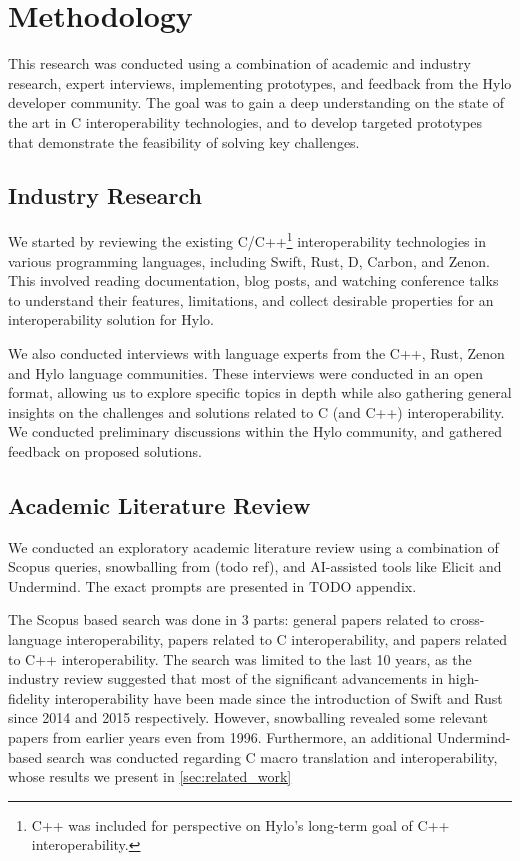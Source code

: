 \section{Methodology}
This research was conducted using a combination of academic and industry research, expert interviews, implementing prototypes, and feedback from the Hylo developer community. The goal was to gain a deep understanding on the state of the art in C interoperability technologies, and to develop targeted prototypes that demonstrate the feasibility of solving key challenges. 

\subsection{Industry Research}
We started by reviewing the existing C/C++\footnote{C++ was included for perspective on Hylo's long-term goal of C++ interoperability.} interoperability technologies in various programming languages, including Swift, Rust, D, Carbon, and Zenon. This involved reading documentation, blog posts, and watching conference talks to understand their features, limitations, and collect desirable properties for an interoperability solution for Hylo.

We also conducted interviews with language experts from the C++, Rust, Zenon and Hylo language communities. These interviews were conducted in an open format, allowing us to explore specific topics in depth while also gathering general insights on the challenges and solutions related to C (and C++) interoperability. We conducted preliminary discussions within the Hylo community, and gathered feedback on proposed solutions.

\subsection{Academic Literature Review}
We conducted an exploratory academic literature review using a combination of Scopus queries, snowballing from (todo ref), and AI-assisted tools like Elicit and Undermind. The exact prompts are presented in TODO appendix.

The Scopus based search was done in 3 parts: general papers related to cross-language interoperability, papers related to C interoperability, and papers related to C++ interoperability. The search was limited to the last 10 years, as the industry review suggested that most of the significant advancements in high-fidelity interoperability have been made since the introduction of Swift and Rust since 2014 and 2015 respectively. However, snowballing revealed some relevant papers from earlier years even from 1996. Furthermore, an additional Undermind-based search was conducted regarding C macro translation and interoperability, whose results we present in \autoref{sec:related_work}

